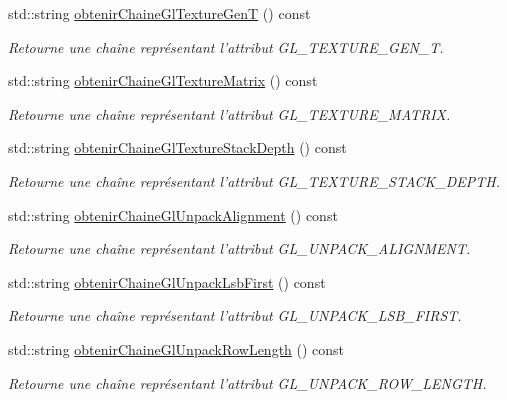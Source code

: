 \begin{DoxyCompactItemize}
std\-::string \hyperlink{group__utilitaire_gaa225300590e106cd32d3a011d1ff6599}{obtenir\-Chaine\-Gl\-Texture\-Gen\-T} () const 
\begin{DoxyCompactList}\small\item\em Retourne une chaîne représentant l'attribut G\-L\-\_\-\-T\-E\-X\-T\-U\-R\-E\-\_\-\-G\-E\-N\-\_\-\-T. \end{DoxyCompactList}\item 
std\-::string \hyperlink{group__utilitaire_gad21a2e048b745fe84c5befbd361f2f5e}{obtenir\-Chaine\-Gl\-Texture\-Matrix} () const 
\begin{DoxyCompactList}\small\item\em Retourne une chaîne représentant l'attribut G\-L\-\_\-\-T\-E\-X\-T\-U\-R\-E\-\_\-\-M\-A\-T\-R\-I\-X. \end{DoxyCompactList}\item 
std\-::string \hyperlink{group__utilitaire_ga278f05112b89edd0cbb3d601d73fadb4}{obtenir\-Chaine\-Gl\-Texture\-Stack\-Depth} () const 
\begin{DoxyCompactList}\small\item\em Retourne une chaîne représentant l'attribut G\-L\-\_\-\-T\-E\-X\-T\-U\-R\-E\-\_\-\-S\-T\-A\-C\-K\-\_\-\-D\-E\-P\-T\-H. \end{DoxyCompactList}\item 
std\-::string \hyperlink{group__utilitaire_gabcc3fe54f0a5f429af71e1bacef5a9c9}{obtenir\-Chaine\-Gl\-Unpack\-Alignment} () const 
\begin{DoxyCompactList}\small\item\em Retourne une chaîne représentant l'attribut G\-L\-\_\-\-U\-N\-P\-A\-C\-K\-\_\-\-A\-L\-I\-G\-N\-M\-E\-N\-T. \end{DoxyCompactList}\item 
std\-::string \hyperlink{group__utilitaire_ga5de4612f68058b5bc47576fc64f97004}{obtenir\-Chaine\-Gl\-Unpack\-Lsb\-First} () const 
\begin{DoxyCompactList}\small\item\em Retourne une chaîne représentant l'attribut G\-L\-\_\-\-U\-N\-P\-A\-C\-K\-\_\-\-L\-S\-B\-\_\-\-F\-I\-R\-S\-T. \end{DoxyCompactList}\item 
std\-::string \hyperlink{group__utilitaire_gaefbf6604571a413d33c117cb1c170a79}{obtenir\-Chaine\-Gl\-Unpack\-Row\-Length} () const 
\begin{DoxyCompactList}\small\item\em Retourne une chaîne représentant l'attribut G\-L\-\_\-\-U\-N\-P\-A\-C\-K\-\_\-\-R\-O\-W\-\_\-\-L\-E\-N\-G\-T\-H. \end{DoxyCompactList}\item 

\end{DoxyCompactItemize}
